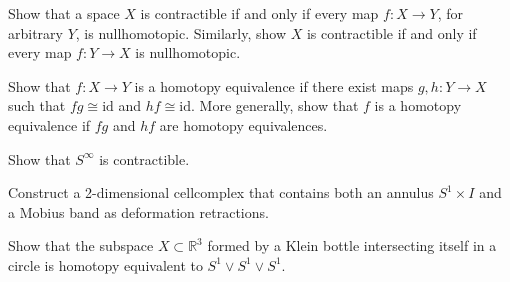 \documentclass[12pt]{article}
\begin{document}
\begin{hatcher}[0.10]
    Show that a space $X$ is contractible if and only if every map $f:X \to Y$, for arbitrary $Y$, is nullhomotopic. Similarly, show $X$ is contractible if and only if every map $f: Y \to X$ is nullhomotopic.
\end{hatcher}

\begin{hatcher}[0.11]
    Show that $f: X \to Y$ is a homotopy equivalence if there exist maps $g,h:Y \to X$ such that $fg \cong \text{id}$ and $hf \cong \text{id}$. More generally, show that $f$ is a homotopy equivalence if $fg$ and $hf$ are homotopy equivalences. 
\end{hatcher}

\begin{hatcher}[0.16]
  Show that $S^{\infty}$ is contractible.
\end{hatcher}

\begin{hatcher}[0.17]
    Construct a 2-dimensional cellcomplex that contains both an annulus $S^1 \times I$ and a Mobius band as 
    deformation retractions.
\end{hatcher}

\begin{hatcher}[0.20]
    Show that the subspace $X \subset \mathbb{R}^3$ formed by a Klein bottle intersecting itself in a circle is homotopy equivalent to $S^1 \vee S^1 \vee S^1$.
\end{hatcher}




\end{document}
